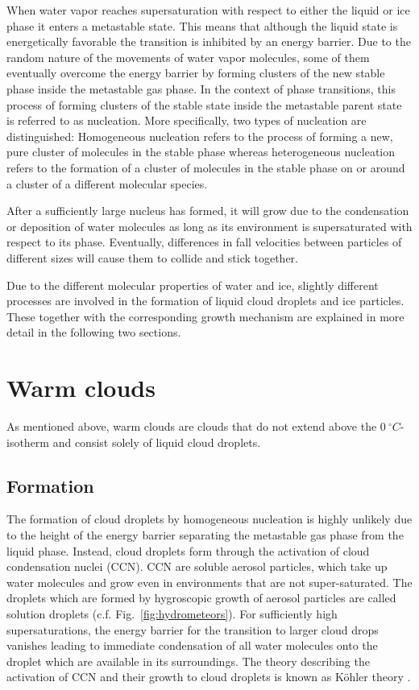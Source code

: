 When water vapor reaches supersaturation with respect to either the liquid or
ice phase it enters a metastable state. This means that although the liquid
state is energetically favorable the transition is inhibited by an energy
barrier. Due to the random nature of the movements of water vapor molecules,
some of them eventually overcome the energy barrier by forming clusters of the
new stable phase inside the metastable gas phase. In the context of phase
transitions, this process of forming clusters of the stable state inside the
metastable parent state is referred to as nucleation. More specifically, two
types of nucleation are distinguished: Homogeneous nucleation refers to the
process of forming a new, pure cluster of molecules in the stable phase whereas
heterogeneous nucleation refers to the formation of a cluster of molecules in
the stable phase on or around a cluster of a different molecular species.

After a sufficiently large nucleus has formed, it will grow due to the
condensation or deposition of water molecules as long as its environment is
supersaturated with respect to its phase. Eventually, differences in fall
velocities between particles of different sizes will cause them to collide and
stick together.

Due to the different molecular properties of water and ice, slightly different
processes are involved in the formation of liquid cloud droplets and ice
particles. These together with the corresponding growth mechanism are explained
in more detail in the following two sections.

\section{Warm clouds}

As mentioned above, warm clouds are clouds that do not extend above
the $0\ \unit{^\circ C}$-isotherm and consist solely of liquid cloud droplets.

\subsection{Formation}

The formation of cloud droplets by homogeneous nucleation is highly unlikely due
to the height of the energy barrier separating the metastable gas phase from the
liquid phase. Instead, cloud droplets form through the activation of cloud
condensation nuclei (CCN). CCN are soluble aerosol particles, which take up
water molecules and grow even in environments that are not super-saturated. The
droplets which are formed by hygroscopic growth of aerosol particles are called
solution droplets (c.f. Fig.~\ref{fig:hydrometeors}). For sufficiently high
supersaturations, the energy barrier for the transition to larger cloud drops
vanishes leading to immediate condensation of all water molecules onto the
droplet which are available in its surroundings. The theory describing the
activation of CCN and their growth to cloud droplets is known as Köhler theory
\cite{kohler36}.

